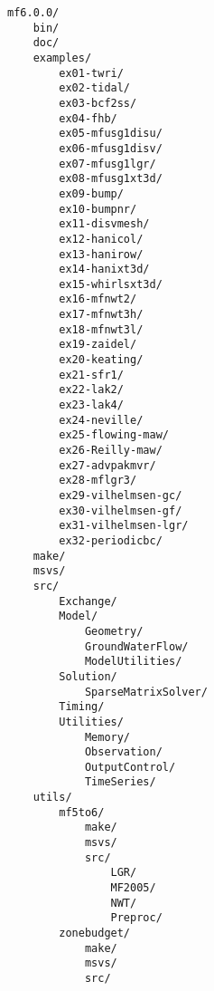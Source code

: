 \begin{verbatim}
mf6.0.0/ 
    bin/ 
    doc/ 
    examples/ 
        ex01-twri/ 
        ex02-tidal/ 
        ex03-bcf2ss/ 
        ex04-fhb/ 
        ex05-mfusg1disu/ 
        ex06-mfusg1disv/ 
        ex07-mfusg1lgr/ 
        ex08-mfusg1xt3d/ 
        ex09-bump/ 
        ex10-bumpnr/ 
        ex11-disvmesh/ 
        ex12-hanicol/ 
        ex13-hanirow/ 
        ex14-hanixt3d/ 
        ex15-whirlsxt3d/ 
        ex16-mfnwt2/ 
        ex17-mfnwt3h/ 
        ex18-mfnwt3l/ 
        ex19-zaidel/ 
        ex20-keating/ 
        ex21-sfr1/ 
        ex22-lak2/ 
        ex23-lak4/ 
        ex24-neville/ 
        ex25-flowing-maw/ 
        ex26-Reilly-maw/ 
        ex27-advpakmvr/ 
        ex28-mflgr3/ 
        ex29-vilhelmsen-gc/ 
        ex30-vilhelmsen-gf/ 
        ex31-vilhelmsen-lgr/ 
        ex32-periodicbc/ 
    make/ 
    msvs/ 
    src/ 
        Exchange/ 
        Model/ 
            Geometry/ 
            GroundWaterFlow/ 
            ModelUtilities/ 
        Solution/ 
            SparseMatrixSolver/ 
        Timing/ 
        Utilities/ 
            Memory/ 
            Observation/ 
            OutputControl/ 
            TimeSeries/ 
    utils/ 
        mf5to6/ 
            make/ 
            msvs/ 
            src/ 
                LGR/ 
                MF2005/ 
                NWT/ 
                Preproc/ 
        zonebudget/ 
            make/ 
            msvs/ 
            src/ 
\end{verbatim}
